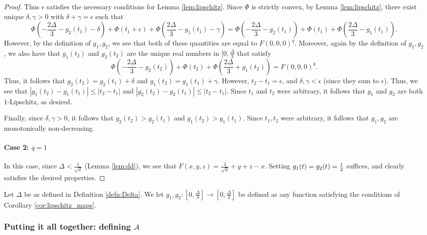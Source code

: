 \begin{proof}
Thus $\epsilon$ satisfies the necessary conditions for Lemma \ref{lem:lipschitz}. Since $\Phi$ is strictly convex, by Lemma \ref{lem:lipschitz}, there exist unique $\delta, \gamma > 0$ with $\delta+ \gamma = \epsilon$ such that $$\Phi(-\frac{2\Delta}{3} - g_2(t_1) - \delta) + \Phi(t_1 + \epsilon) + \Phi(\frac{2\Delta}{3} - g_1(t_1) - \gamma) = \Phi(-\frac{2\Delta}{3} - g_2(t_1)) + \Phi(t_1) + \Phi(\frac{2\Delta}{3} - g_1(t_1)).$$ However, by the definition of $g_1, g_2$, we see that both of these quantities are equal to $F(0,0,0)^q$. Moreover, again by the definition of $g_1, g_2$, we also have that $g_1(t_2)$ and $g_2(t_2)$ are the unique real numbers in $[0, \frac{\Delta}{3}$ that satisfy $$\Phi(-\frac{2\Delta}{3} - g_2(t_2)) + \Phi(t_2) + \Phi(\frac{2\Delta}{3}+g_1(t_2)) = F(0,0,0)^q.$$ Thus, it follows that $g_2(t_2) = g_2(t_1) + \delta$ and $g_1(t_2) = g_1(t_1) + \gamma$. However, $t_2 - t_1 = \epsilon$, and $\delta, \gamma < \epsilon$ (since they sum to $\epsilon$). Thus, we see that $|g_1(t_2) - g_1(t_1)| \leq |t_2 - t_1|$ and $|g_2(t_2) - g_2(t_1)| \leq |t_2 - t_1|$. Since $t_1$ and $t_2$ were arbitrary, it follows that $g_1$ and $g_2$ are both $1$-Lipschitz, as desired. 

Finally, since $\delta, \gamma > 0$, it follows that $g_2(t_2) > g_2(t_1)$ and $g_1(t_2) > g_1(t_1)$. Since $t_1, t_2$ were arbitrary, it follows that $g_1, g_2$ are monotonically non-decreasing.

\paragraph{Case 2: $q = 1$} In this case, since $\Delta < \frac{1}{\sqrt{d}}$ (Lemma \ref{lem:dd}), we see that $F(x, y, z) = \frac{3}{\sqrt{d}} + y + z - x$. Setting $g_1(t) = g_2(t) = \frac{t}{2}$ suffices, and clearly satisfies the desired properties. 
\end{proof}

\begin{defn}\label{defn:g_1_and_g_2}
Let $\Delta$ be as defined in Definition \ref{defn:Delta}. We let $g_1, g_2: [0, \frac{\Delta}{3}] \to [0, \frac{\Delta}{3}]$ be defined as any function satisfying the conditions of Corollary \ref{cor:lipschitz_maps}.
\end{defn}

\subsubsection{Putting it all together: defining $\mathcal{A}$}\label{subsubsec:finalA}

